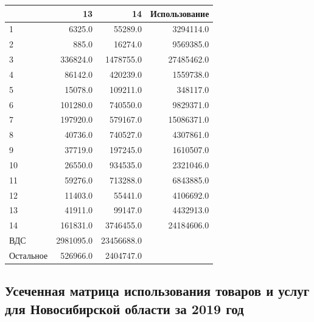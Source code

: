 \documentclass[12pt, a4paper]{article}
\begin{document}
\begin{tabular}{|l|rrr|}
\hline
& 13 &          14 &  Использование \\
\hline
1 &  6325.0 &     55289.0 &    3294114.0 \\
2 &   885.0 &     16274.0 &    9569385.0 \\
3&   336824.0 &   1478755.0 &   27485462.0 \\
4&   86142.0 &    420239.0 &    1559738.0 \\
5&   15078.0 &    109211.0 &     348117.0 \\
6&  101280.0 &    740550.0 &    9829371.0 \\
7&  197920.0 &    579167.0 &   15086371.0 \\
8& 40736.0 &    740527.0 &    4307861.0 \\
9&   37719.0 &    197245.0 &    1610507.0 \\
10& 26550.0 &    934535.0 &    2321046.0 \\
11& 59276.0 &    713288.0 &    6843885.0 \\
12&  11403.0 &     55441.0 &    4106692.0 \\
13&   41911.0 &     99147.0 &    4432913.0 \\
14& 161831.0 &   3746455.0 &   24184606.0 \\
ВДС& 2981095.0 &  23456688.0 &         \\
Остальное&  526966.0 &   2404747.0 &         \\
\hline
\end{tabular}


\subsection{Усеченная матрица использования товаров и услуг для Новосибирской области за 2019 год}
\end{document}
